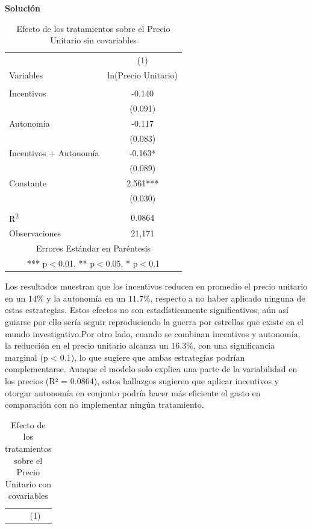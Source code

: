 \documentclass[a4paper, answers, addpoints, 11pt]{exam}
\newenvironment{solucion}{%
  \begin{mdframed}[
    backgroundcolor=blue!5,    %
    linecolor=blue!50,          %
    linewidth=2pt,              %
    leftmargin=10pt,            %
    rightmargin=8pt,           %
    topline=true,              %
    bottomline=true,            %
    roundcorner=10pt,           %
    innerleftmargin=10pt,       %
    innerrightmargin=10pt,      %
    innerbottommargin=10pt,     %
    innertopmargin=10pt         %
  ]%
  \begin{tcolorbox}[colframe=blue!50!black, colback=blue!50, coltitle=white, sharp corners=all, boxrule=1mm, width=\textwidth, halign=left, valign=center, top=0mm, bottom=0mm, left=0mm, right=0mm] \textbf{Solución} \end{tcolorbox} }{\end{mdframed}}
\begin{document}
\begin{enumerate}
      \begin{solucion}
     \begin{table}[H]
    \centering
    \caption{Efecto de los tratamientos sobre el Precio Unitario sin covariables}
    \begin{tabular}{lc} \hline
    & (1) \\
    Variables & ln(Precio Unitario) \\ \hline
    &  \\
    Incentivos & -0.140 \\
    & (0.091) \\
    Autonomía & -0.117 \\
    & (0.083) \\
    Incentivos + Autonomía & -0.163* \\
    & (0.089) \\
    Constante & 2.561*** \\
    & (0.030) \\
    &  \\
    R\textsuperscript{2} & 0.0864 \\
    Observaciones & 21,171 \\ \hline
    \multicolumn{2}{c}{ Errores Estándar en Paréntesis} \\
    \multicolumn{2}{c}{ *** p$<$0.01, ** p$<$0.05, * p$<$0.1} \\
    \end{tabular}
\end{table}
Los resultados muestran que los incentivos reducen en promedio el precio unitario en un $14\%$ y la autonomía en un $11.7\%$, respecto a no haber aplicado ninguna de estas estrategias. Estos efectos no son estadísticamente significativos, aún así guiarse por ello sería seguir reproduciendo la guerra por estrellas que existe en el mundo investigativo.Por otro lado, cuando se combinan incentivos y autonomía, la reducción en el precio unitario alcanza un $16.3\%$, con una significancia marginal (p < 0.1), lo que sugiere que ambas estrategias podrían complementarse. Aunque el modelo solo explica una parte de la variabilidad en los precios (R² = 0.0864), estos hallazgos sugieren que aplicar incentivos y otorgar autonomía en conjunto podría hacer más eficiente el gasto en comparación con no implementar ningún tratamiento.
\begin{table}[H]
    \centering
    \caption{Efecto de los tratamientos sobre el Precio Unitario con covariables}
    \begin{tabular}{lc} \hline
    & (1) \\

\end{tabular}
\end{table}
\end{solucion}
\end{enumerate}
\end{document}

